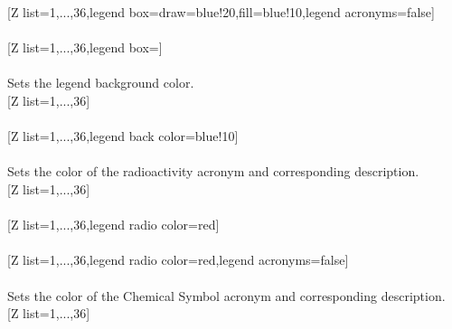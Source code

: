 \newpage%
[Z list={1,...,36},legend box={draw=blue!20,fill=blue!10,legend acronyms=false}]%
\\ [10pt]\makebox[\linewidth][c]{\scalebox{.6}{\pgfPT[Z list={1,...,36},legend box={draw=blue!20,fill=blue!10},legend acronyms=false]}}%
\\ [10pt][Z list={1,...,36},legend box={}]%
\\ [10pt]\makebox[\linewidth][c]{\scalebox{.6}{\pgfPT[Z list={1,...,36},legend box={}]}}%
\\ [0pt]\pgfPTendstyle%
\label{option_legend back color}%
%
{Sets the legend background color.}%
\\ [5pt][Z list={1,...,36}]%
\\ [10pt]\makebox[\linewidth][c]{\scalebox{.6}{\pgfPT[Z list={1,...,36}]}}%
\\ [10pt][Z list={1,...,36},legend back color=blue!10]%
\\ [10pt]\makebox[\linewidth][c]{\scalebox{.6}{\pgfPT[Z list={1,...,36},legend back color=blue!10]}}%
\\ [0pt]\pgfPTendoption%
\label{option_legend radio color}%
%
{Sets the color of the radioactivity acronym and corresponding description.}%
\\ [5pt][Z list={1,...,36}]%
\\ [10pt]\makebox[\linewidth][c]{\scalebox{.6}{\pgfPT[Z list={1,...,36}]}}%
\\ [10pt][Z list={1,...,36},legend radio color=red]%
\\ [10pt]\makebox[\linewidth][c]{\scalebox{.6}{\pgfPT[Z list={1,...,36},legend radio color=red]}}%
\\ [10pt][Z list={1,...,36},legend radio color=red,legend acronyms=false]%
\\ [10pt]\makebox[\linewidth][c]{\scalebox{.6}{\pgfPT[Z list={1,...,36},legend radio color=red,legend acronyms=false]}}%
\\ [0pt]\pgfPTendoption%
\label{option_legend CS color}%
%
{Sets the color of the Chemical Symbol acronym and corresponding description.}%
\\ [5pt][Z list={1,...,36}]%
\\ [10pt]\makebox[\linewidth][c]{\scalebox{.6}{\pgfPT[Z list={1,...,36}]}}%
